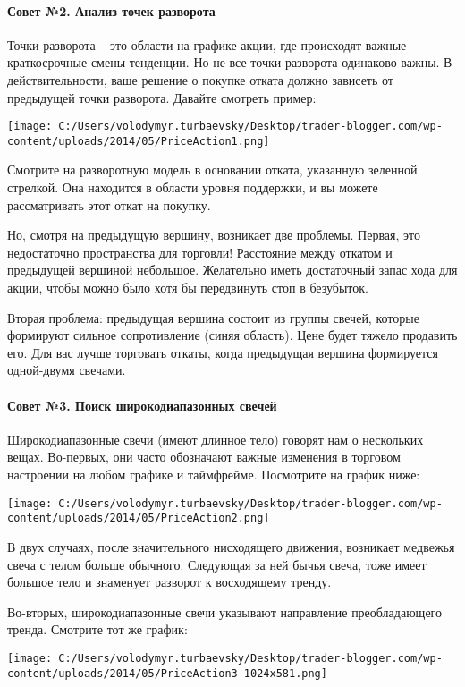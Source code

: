 \documentclass[a5paper]{article}
\begin{document}
\paragraph{Совет №2. Анализ точек разворота}

Точки разворота – это области на графике акции, где происходят важные
краткосрочные смены тенденции. Но не все точки разворота одинаково
важны. В действительности, ваше решение о покупке отката должно
зависеть от предыдущей точки разворота. Давайте смотреть пример:

\texttt{[image: C:/Users/volodymyr.turbaevsky/Desktop/trader-blogger.com/wp-content/uploads/2014/05/PriceAction1.png]}

Смотрите на разворотную модель в основании отката, указанную зеленной стрелкой. Она находится в области уровня поддержки, и вы можете рассматривать этот откат на покупку.

Но, смотря на предыдущую вершину, возникает две проблемы. Первая, это недостаточно пространства для торговли! Расстояние между откатом и предыдущей вершиной небольшое. Желательно иметь достаточный запас хода для акции, чтобы можно было хотя бы передвинуть стоп в безубыток.

Вторая проблема: предыдущая вершина состоит из группы свечей, которые
формируют сильное сопротивление (синяя область). Цене будет тяжело
продавить его. Для вас лучше торговать откаты, когда предыдущая
вершина формируется одной-двумя свечами.

\paragraph{Совет №3. Поиск широкодиапазонных свечей}

Широкодиапазонные свечи (имеют длинное тело) говорят нам о нескольких
вещах. Во-первых, они часто обозначают важные изменения в торговом
настроении на любом графике и таймфрейме. Посмотрите на график ниже:

\texttt{[image: C:/Users/volodymyr.turbaevsky/Desktop/trader-blogger.com/wp-content/uploads/2014/05/PriceAction2.png]}

В двух случаях, после значительного нисходящего движения, возникает медвежья свеча с телом больше обычного. Следующая за ней бычья свеча, тоже имеет большое тело и знаменует разворот к восходящему тренду.

Во-вторых, широкодиапазонные свечи указывают направление
преобладающего тренда. Смотрите тот же график:

\texttt{[image: C:/Users/volodymyr.turbaevsky/Desktop/trader-blogger.com/wp-content/uploads/2014/05/PriceAction3-1024x581.png]}
\end{document}
